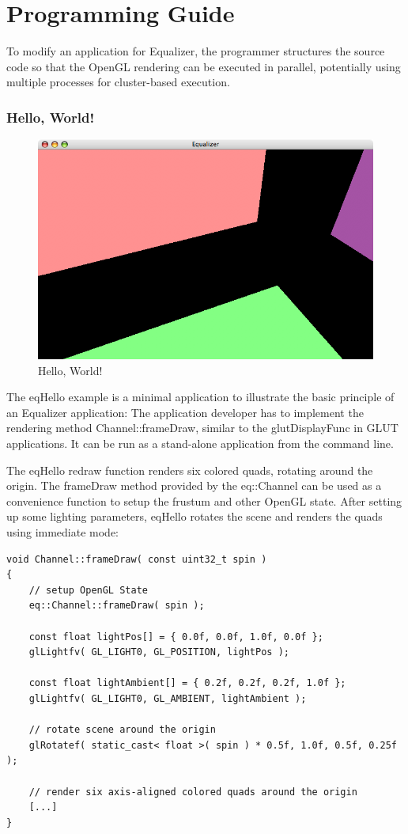 \documentclass[10pt,a4]{scrartcl}
\begin{document}
\clearpage
\part{Programming Guide}

To modify an application for Equalizer, the programmer structures the
source code so that the OpenGL rendering can be executed in parallel,
potentially using multiple processes for cluster-based execution.

\section{Hello, World!}

\begin{figure}
  \includegraphics[width=.618\textwidth]{images/eqHello.png}
  {\caption{\label{fHello}Hello, World!}}
\end{figure}
The \textsf{eqHello} example is a minimal application to illustrate the
basic principle of an Equalizer application: The application developer
has to implement the rendering method \textsf{Channel::frameDraw},
similar to the \textsf{glutDisplayFunc} in GLUT applications. It can be
run as a stand-alone application from the command line.

The \textsf{eqHello} redraw function renders six colored quads, rotating
around the origin. The \textsf{frameDraw} meth\-od provided by the
\textsf{eq::Channel} can be used as a convenience function to setup the
frustum and other OpenGL state. After setting up some lighting
parameters, \textsf{eqHello} rotates the scene and renders the quads
using immediate mode:

{\footnotesize\begin{lstlisting}
void Channel::frameDraw( const uint32_t spin )
{
    // setup OpenGL State
    eq::Channel::frameDraw( spin );
    
    const float lightPos[] = { 0.0f, 0.0f, 1.0f, 0.0f };
    glLightfv( GL_LIGHT0, GL_POSITION, lightPos );

    const float lightAmbient[] = { 0.2f, 0.2f, 0.2f, 1.0f };
    glLightfv( GL_LIGHT0, GL_AMBIENT, lightAmbient );

    // rotate scene around the origin
    glRotatef( static_cast< float >( spin ) * 0.5f, 1.0f, 0.5f, 0.25f );

    // render six axis-aligned colored quads around the origin
    [...]
}
\end{lstlisting}}
\end{document}
